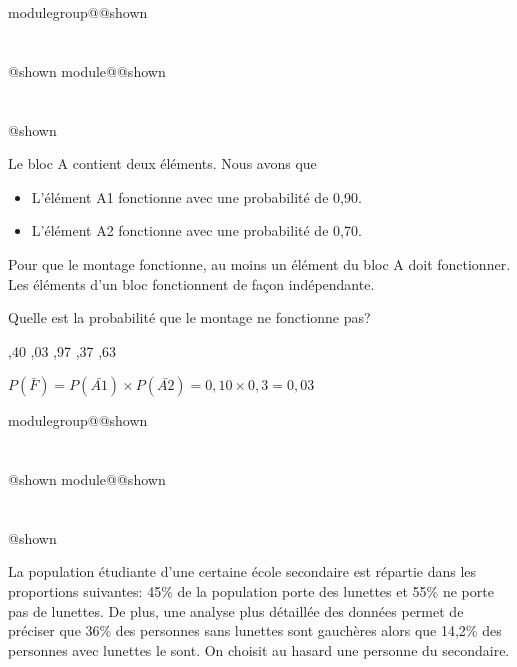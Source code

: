 \documentclass{Evaluation}
\makeatletter
\newcommand{\currentmodulekey}{}
\newcommand{\currentmoduletitle}{}
\newcommand{\currentgroupkey}{}
\newcommand{\currentgrouptitle}{}
\newcommand{\showmoduleifneeded}{%
  \ifx\currentgroupkey\empty\else
    \expandafter\ifx\csname modulegroup@\currentgroupkey @shown\endcsname\relax
      \section*{\currentgrouptitle}%
      \expandafter\gdef\csname modulegroup@\currentgroupkey @shown\endcsname{1}%
    \fi
  \fi
  \expandafter\ifx\csname module@\currentmodulekey @shown\endcsname\relax
    \section*{\currentmoduletitle}%
    \expandafter\gdef\csname module@\currentmodulekey @shown\endcsname{1}%
  \fi
}
\newenvironment{A22}{\showmoduleifneeded}{}
\makeatother
\begin{document}
\begin{questions}
\begin{A22}
 Le bloc A contient deux éléments. Nous avons que
\begin{itemize}
    \item L'élément A1 fonctionne avec une probabilité de 0,90.
    \item L'élément A2 fonctionne avec une probabilité de 0,70.
\end{itemize}
Pour que le montage fonctionne, au moins un élément du bloc A doit fonctionner. Les éléments d'un bloc fonctionnent de façon indépendante.


 Quelle est la probabilité que le montage ne fonctionne pas?

\begin{checkboxes}
		,40
		,03
		,97
		,37
		,63
	\end{checkboxes}



\begin{solution}
$P(\bar{F})= P(\bar{A1}) \times P(\bar{A2}) = 0,10 \times 0,3 = 0,03$
\end{solution}

\end{A22}

\begin{A22}
\question {} %

La population étudiante d'une certaine école secondaire est répartie dans les proportions suivantes: 45\% de la population porte des lunettes et 55\% ne porte pas de lunettes. De plus, une analyse plus détaillée des données permet de préciser que 36\% des personnes sans lunettes sont gauchères alors que 14,2\% des personnes avec lunettes le sont. On choisit au hasard une personne du secondaire.

\end{A22}
\end{questions}
\end{document}
